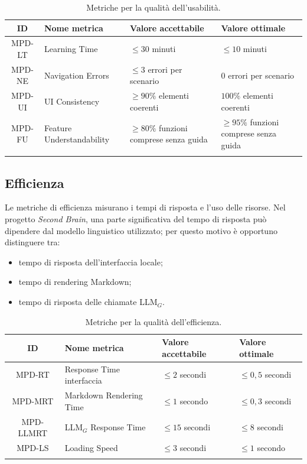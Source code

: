 \documentclass[a4paper, 10pt, colorlinks=true, linkcolor=black, urlcolor=blue, citecolor=blue, hidelinks]{article}
\begin{document}
\begingroup
\small
\renewcommand{\arraystretch}{1.25}
\begin{longtable}{|c|p{4cm}|p{3cm}|p{3cm}|}
    \hline
    \textbf{ID} & \textbf{Nome metrica} & \textbf{Valore accettabile} & \textbf{Valore ottimale} \\
    \hline
    \endhead

    MPD-LT & Learning Time & $\leq 30$ minuti & $\leq 10$ minuti \\ \hline
    MPD-NE & Navigation Errors & $\leq 3$ errori per scenario & $0$ errori per scenario \\ \hline
    MPD-UI & UI Consistency & $\geq 90\%$ elementi coerenti & $100\%$ elementi coerenti \\ \hline
    MPD-FU & Feature Understandability & $\geq 80\%$ funzioni comprese senza guida & $\geq 95\%$ funzioni comprese senza guida \\ \hline

    \caption{Metriche per la qualità dell'usabilità.}
    \label{tab:metriche-usabilita}
\end{longtable}
\endgroup

\subsection{Efficienza}

Le metriche di efficienza misurano i tempi di risposta e l'uso delle risorse. Nel progetto \textit{Second Brain}, una parte significativa del tempo di risposta può dipendere dal modello linguistico utilizzato; per questo motivo è opportuno distinguere tra:
\begin{itemize}
    \item tempo di risposta dell'interfaccia locale;
    \item tempo di rendering Markdown;
    \item tempo di risposta delle chiamate LLM$_G$.
\end{itemize}

\begingroup
\small
\renewcommand{\arraystretch}{1.25}
\begin{longtable}{|c|p{4cm}|p{3cm}|p{3cm}|}
    \hline
    \textbf{ID} & \textbf{Nome metrica} & \textbf{Valore accettabile} & \textbf{Valore ottimale} \\
    \hline
    \endhead

    MPD-RT & Response Time interfaccia & $\leq 2$ secondi & $\leq 0{,}5$ secondi \\ \hline
    MPD-MRT & Markdown Rendering Time & $\leq 1$ secondo & $\leq 0{,}3$ secondi \\ \hline
    MPD-LLMRT & LLM$_G$ Response Time & $\leq 15$ secondi & $\leq 8$ secondi \\ \hline
    MPD-LS & Loading Speed & $\leq 3$ secondi & $\leq 1$ secondo \\ \hline

    \caption{Metriche per la qualità dell'efficienza.}
    \label{tab:metriche-efficienza}
\end{longtable}
\endgroup
\end{document}
